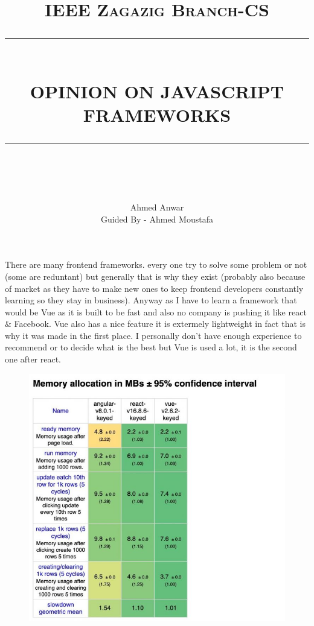 \documentclass[12pt]{report}
\newcommand{\HRule}[1]{\rule{\linewidth}{#1}}
\begin{document}
\title{ \normalsize \textsc{IEEE Zagazig Branch-CS}
		\\ [2.0cm]
		\HRule{0.5pt} \\
		\LARGE \textbf{\uppercase{OPINION ON JAVASCRIPT FRAMEWORKS}}
		\HRule{2pt} \\ [0.5cm]
		\normalsize  \vspace*{5\baselineskip}}

\date{}

\author{
		Ahmed Anwar \\
        Guided By - Ahmed Moustafa\\ }

\maketitle
\newpage
There are many frontend frameworks. every one try to solve some problem or not (some are reduntant) but generally that is why they exist (probably also because of market as they have to make new ones to keep frontend developers constantly learning so they stay in business). Anyway as I have to learn a framework that would be Vue as it is built to be fast and also no company is pushing it like react \& Facebook. Vue also has a nice feature it is extermely lightweight in fact that is why it was made in the first place. I personally don't have enough experience to recommend or to decide what is the best but Vue is used a lot, it is the second one after react.
\begin{figure}[h]
\includegraphics[width=\textwidth]{memory-allocation-comparison}
\end{figure}
\end{document}
